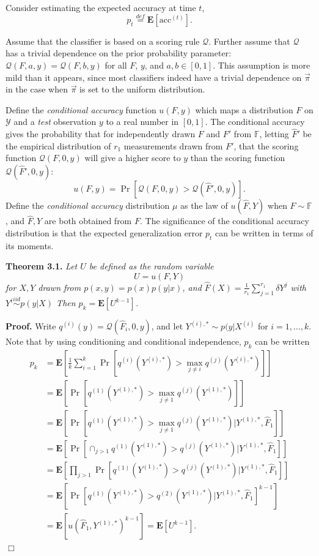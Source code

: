 \documentclass{article}
\newcommand{\E}{\textbf{E}}
\begin{document}
Consider estimating the expected accuracy at time $t$, \[p_t
\stackrel{def}{=} \E[\text{acc}^{(t)}].\]

Assume that the classifier is based on a scoring rule $\mathcal{Q}$.
Further assume that $\mathcal{Q}$ has a trivial dependence on the
prior probability parameter: $\mathcal{Q}(F, a, y) = \mathcal{Q}(F, b,
y)$ for all $F$, $y$, and $a, b \in [0, 1]$.  This assumption is more
mild than it appears, since most classifiers indeed have a trivial
dependence on $\vec{\pi}$ in the case when $\vec{\pi}$ is set to the
uniform distribution.

Define the \emph{conditional accuracy} function $u(F, y)$ which maps a
distribution $F$ on $\mathcal{Y}$ and a \emph{test} observation $y$ to
a real number in $[0,1]$.  The conditional accuracy gives the
probability that for independently drawn $F$ and $F'$ from
$\mathbb{F}$, letting $\hat{F}'$ be the empirical distribution of
$r_1$ measurements drawn from $F'$, that the scoring function
$\mathcal{Q}(F, 0, y)$ will give a higher score to $y$ than the
scoring function $\mathcal{Q}(\hat{F}', 0, y)$:
\[
u(F, y) = \Pr[\mathcal{Q}(F, 0, y) > \mathcal{Q}(\hat{F}', 0, y)].
\]
Define the \emph{conditional accuracy} distribution $\mu$ as the law
of $u(\hat{F}, Y)$ when $F \sim \mathbb{F}$, and $\hat{F}, Y$ are both
obtained from $F$.  The significance of the conditional accuracy
distribution is that the expected generalization error $p_t$ can be
written in terms of its moments.

\noindent\textbf{Theorem 3.1.} \emph{
Let $U$ be defined as the random variable
\[U = u(F, Y)\]
for $X, Y$ drawn from $p(x, y) = p(x) p(y|x)$,
and $\hat{F}(X) = \frac{1}{r_1}\sum_{j=1}^{r_1} \delta{Y^j}$ with $Y^i \stackrel{iid}{\sim} p(y|X)$
Then $p_k = \E[U^{k-1}]$.
}

\noindent\textbf{Proof.}  
Write $q^{(i)}(y) = \mathcal{Q}(\hat{F}_i, 0, y)$, and let $Y^{(i), *} \sim p(y|X^{(i)}$ for $i = 1,\hdots, k$.
Note that by using conditioning and
conditional independence, $p_k$ can be written
\begin{align*}
p_k &= \E\left[ \frac{1}{k}\sum_{i=1}^k  \Pr[q^{(i)}(Y^{(i), *}) > \max_{j\neq i} q^{(j)}(Y^{(i), *})] \right]
\\&= \E\left[ \Pr[q^{(1)}(Y^{(1), *}) > \max_{j\neq 1} q^{(j)}(Y^{(1), *})] \right]
\\&= \E[\Pr[q^{(1)}(Y^{(1), *}) > \max_{j\neq 1} q^{(j)}(Y^{(1), *})|Y^{(1), *}, \hat{F}_1]]
\\&= \E[\Pr[\cap_{j > 1} q^{(1)}(Y^{(1), *}) > q^{(j)}(Y^{(1), *})|Y^{(1), *}, \hat{F}_1]]
\\&= \E[\prod_{j > 1}\Pr[q^{(1)}(Y^{(1), *}) > q^{(j)}(Y^{(1), *})|Y^{(1), *}, \hat{F}_1]]
\\&= \E[\Pr[q^{(1)}(Y^{(1), *}) > q^{(2)}(Y^{(1), *})|Y^{(1), *}, \hat{F}_1]^{k-1}]
\\&= \E[u(\hat{F}_1, Y^{(1), *})^{k-1}] = \E[U^{k-1}].
\end{align*}
$\Box$
\end{document}
